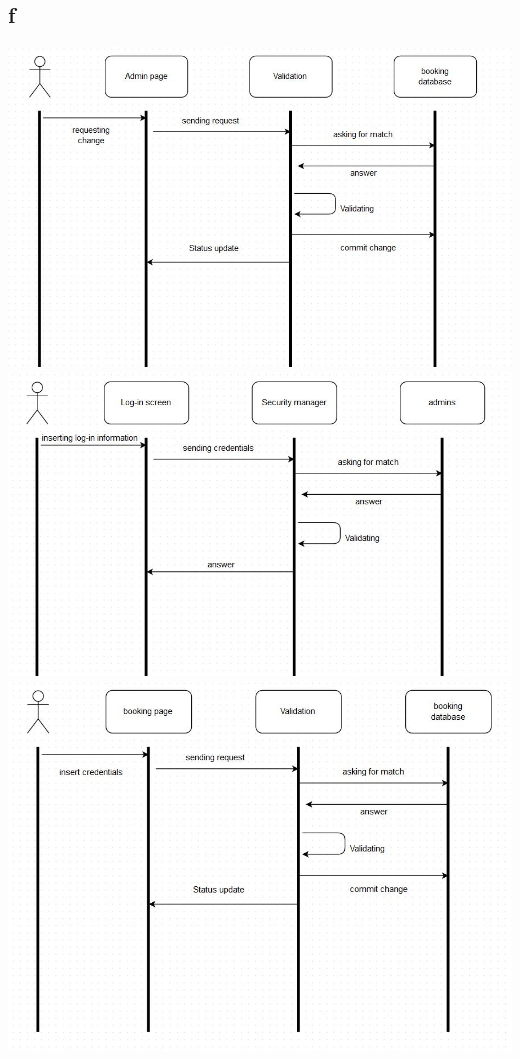\documentclass[12pt,a4paper]{article}
\begin{document}
\subsection{f}
\includegraphics[scale=0.4]{adminInteraction.jpg}\\
\includegraphics[scale=0.4]{adminLog-in.jpg}\\
\includegraphics[scale=0.4]{customerLog-in.jpg}
\newpage
\end{document}
